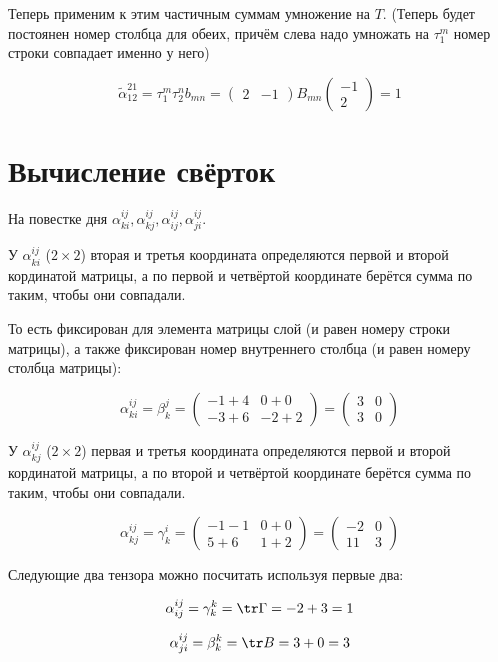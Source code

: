 \documentclass[12pt, a4paper]{article}
\begin{document}
    Теперь применим к этим частичным суммам умножение на $T$. 
    (Теперь будет постоянен номер столбца для обеих, причём слева надо умножать на $\tau_{1}^{m}$ номер строки совпадает именно у него)

    \begin{equation}
        \tilde{\alpha}_{12}^{21} = \tau_{1}^{m} \tau_{2}^{n} b_{m n} = 
        \begin{pmatrix} 2 & -1 \end{pmatrix} B_{mn} \begin{pmatrix} -1 \\ 2 \end{pmatrix} 
        = 1
    \end{equation}

    \section{Вычисление свёрток}

    На повестке дня $\alpha^{ij}_{ki}, \alpha^{ij}_{kj}, \alpha^{ij}_{ij}, \alpha^{ij}_{ji}$.

    У $\alpha^{ij}_{ki}$ ($2\times 2$) вторая и третья координата 
    определяются первой и второй кординатой матрицы, а по первой и четвёртой координате берётся сумма по таким, 
    чтобы они совпадали.

    То есть фиксирован для элемента матрицы слой (и равен номеру строки матрицы), 
    а также фиксирован номер внутреннего столбца (и равен номеру столбца матрицы):

    \begin{equation}
        \alpha^{ij}_{ki} = \beta^{j}_{k} = \begin{pmatrix}
            -1 + 4 & 0 + 0 \\
            -3 + 6 & -2 + 2
        \end{pmatrix} = \begin{pmatrix}
            3 & 0 \\
            3 & 0
        \end{pmatrix}
    \end{equation}

    У $\alpha^{ij}_{kj}$ ($2\times 2$) первая и третья координата 
    определяются первой и второй кординатой матрицы, а по второй и четвёртой координате берётся сумма по таким, 
    чтобы они совпадали.

    \begin{equation}
        \alpha^{ij}_{kj} = \gamma^{i}_{k} = \begin{pmatrix}
            -1 - 1 & 0 + 0 \\
            5 + 6 & 1 + 2
        \end{pmatrix} = \begin{pmatrix}
            -2 & 0 \\
            11 & 3
        \end{pmatrix}
    \end{equation}

    Следующие два тензора можно посчитать используя первые два:

    \begin{equation}
        \alpha^{ij}_{ij} = \gamma^{k}_{k} = \tr \Gamma = -2 + 3 = 1
    \end{equation}

    \begin{equation}
        \alpha^{ij}_{ji} = \beta^{k}_{k} = \tr B = 3 + 0 = 3
    \end{equation}
    
\end{document}
